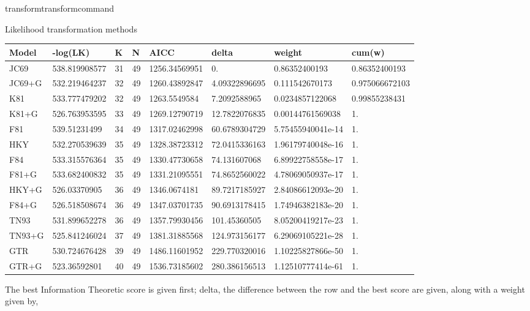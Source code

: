\begin{command}{transform}{transformcommand}
\begin{arguments}
\begin{argumentgroup}{Likelihood transformation methods}
{                \begin{center}
                    \begin{tabular}{ l l l l | l l l || l }
                    Model & -log(LK)    & K& N& AICC        & delta       &weight           &cum(w)         \\
                    \hline
                    JC69  &538.819908577&31&49&1256.34569951&0.           &0.86352400193    &0.86352400193  \\
                    JC69+G&532.219464237&32&49&1260.43892847&4.09322896695&0.111542670173   &0.975066672103 \\
                    K81   &533.777479202&32&49&1263.5549584 &7.2092588965 &0.0234857122068  &0.99855238431  \\
                    K81+G &526.763953595&33&49&1269.12790719&12.7822076835&0.00144761569038 &1. \\
                    F81   &539.51231499 &34&49&1317.02462998&60.6789304729&5.75455940041e-14&1. \\
                    HKY   &532.270539639&35&49&1328.38723312&72.0415336163&1.96179740048e-16&1. \\
                    F84   &533.315576364&35&49&1330.47730658&74.131607068 &6.89922758558e-17&1. \\
                    F81+G &533.682400832&35&49&1331.21095551&74.8652560022&4.78069050937e-17&1. \\
                    HKY+G &526.03370905 &36&49&1346.0674181 &89.7217185927&2.84086612093e-20&1. \\
                    F84+G &526.518508674&36&49&1347.03701735&90.6913178415&1.74946382183e-20&1. \\
                    TN93  &531.899652278&36&49&1357.79930456&101.45360505 &8.05200419217e-23&1. \\
                    TN93+G&525.841246024&37&49&1381.31885568&124.973156177&6.29069105221e-28&1. \\
                    GTR   &530.724676428&39&49&1486.11601952&229.770320016&1.10225827866e-50&1. \\
                    GTR+G &523.36592801 &40&49&1536.73185602&280.386156513&1.12510777414e-61&1. \\
                    \end{tabular}
                \end{center}

                The best Information Theoretic score is given first; delta, the
                difference between the row and the best score are given, along
                with a weight given by,

}
\end{argumentgroup}
\end{arguments}
\end{command}
